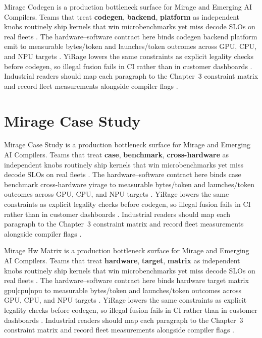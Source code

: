 Mirage Codegen is a production bottleneck surface for Mirage and Emerging AI Compilers. Teams that treat \textbf{codegen}, \textbf{backend}, \textbf{platform} as independent knobs routinely ship kernels that win microbenchmarks yet miss decode SLOs on real fleets \citep{nvidia2022hopper,amd2024aie}. The hardware--software contract here binds codegen backend platform emit to measurable bytes/token and launches/token outcomes across GPU, CPU, and NPU targets \citep{semianalysis2024tma,dlbook}. YiRage lowers the same constraints as explicit legality checks before codegen, so illegal fusion fails in CI rather than in customer dashboards \citep{amd2024xdna,dao2022flashattention}. Industrial readers should map each paragraph to the Chapter~3 constraint matrix and record fleet measurements alongside compiler flags \citep{amd2024aie,kwon2023vllm}.

\section{Mirage Case Study}
\label{sec:mirage_case_study}

Mirage Case Study is a production bottleneck surface for Mirage and Emerging AI Compilers. Teams that treat \textbf{case}, \textbf{benchmark}, \textbf{cross-hardware} as independent knobs routinely ship kernels that win microbenchmarks yet miss decode SLOs on real fleets \citep{semianalysis2024tma,dlbook}. The hardware--software contract here binds case benchmark cross-hardware yirage to measurable bytes/token and launches/token outcomes across GPU, CPU, and NPU targets \citep{amd2024xdna,dao2022flashattention}. YiRage lowers the same constraints as explicit legality checks before codegen, so illegal fusion fails in CI rather than in customer dashboards \citep{amd2024aie,kwon2023vllm}. Industrial readers should map each paragraph to the Chapter~3 constraint matrix and record fleet measurements alongside compiler flags \citep{dlbook,nvidia2024cudagraphs}.

Mirage Hw Matrix is a production bottleneck surface for Mirage and Emerging AI Compilers. Teams that treat \textbf{hardware}, \textbf{target}, \textbf{matrix} as independent knobs routinely ship kernels that win microbenchmarks yet miss decode SLOs on real fleets \citep{memoryfloor2026,amd2024xdna}. The hardware--software contract here binds hardware target matrix gpu|cpu|npu to measurable bytes/token and launches/token outcomes across GPU, CPU, and NPU targets \citep{nvidia2022hopper,amd2024aie}. YiRage lowers the same constraints as explicit legality checks before codegen, so illegal fusion fails in CI rather than in customer dashboards \citep{semianalysis2024tma,dlbook}. Industrial readers should map each paragraph to the Chapter~3 constraint matrix and record fleet measurements alongside compiler flags \citep{amd2024xdna,dao2022flashattention}.

